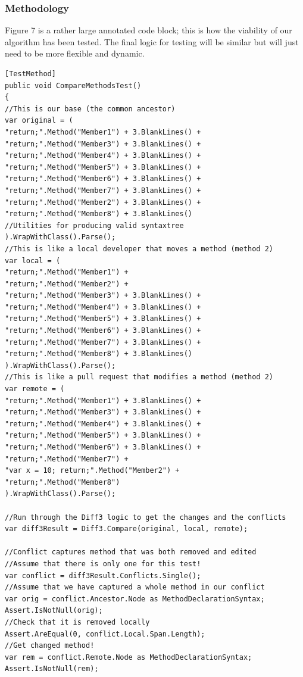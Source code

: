 \documentclass[10pt,draftclsnofoot,onecolumn]{IEEEtran}
\begin{document}
\subsubsection{Methodology}
Figure 7 is a rather large annotated code block; this is how the viability of our algorithm has been tested. The final logic for testing will be similar but will just need to be more flexible and dynamic.

\begingroup
\begin{lstlisting}
[TestMethod]
public void CompareMethodsTest()
{
//This is our base (the common ancestor)
var original = (
"return;".Method("Member1") + 3.BlankLines() +
"return;".Method("Member3") + 3.BlankLines() +
"return;".Method("Member4") + 3.BlankLines() +
"return;".Method("Member5") + 3.BlankLines() +
"return;".Method("Member6") + 3.BlankLines() +
"return;".Method("Member7") + 3.BlankLines() +
"return;".Method("Member2") + 3.BlankLines() +
"return;".Method("Member8") + 3.BlankLines()
//Utilities for producing valid syntaxtree
).WrapWithClass().Parse(); 
//This is like a local developer that moves a method (method 2)
var local = (
"return;".Method("Member1") +
"return;".Method("Member2") +
"return;".Method("Member3") + 3.BlankLines() +
"return;".Method("Member4") + 3.BlankLines() +
"return;".Method("Member5") + 3.BlankLines() +
"return;".Method("Member6") + 3.BlankLines() +
"return;".Method("Member7") + 3.BlankLines() +
"return;".Method("Member8") + 3.BlankLines()
).WrapWithClass().Parse();
//This is like a pull request that modifies a method (method 2)
var remote = (
"return;".Method("Member1") + 3.BlankLines() +
"return;".Method("Member3") + 3.BlankLines() +
"return;".Method("Member4") + 3.BlankLines() +
"return;".Method("Member5") + 3.BlankLines() +
"return;".Method("Member6") + 3.BlankLines() +
"return;".Method("Member7") +
"var x = 10; return;".Method("Member2") +
"return;".Method("Member8")
).WrapWithClass().Parse();

//Run through the Diff3 logic to get the changes and the conflicts
var diff3Result = Diff3.Compare(original, local, remote);

//Conflict captures method that was both removed and edited
//Assume that there is only one for this test!
var conflict = diff3Result.Conflicts.Single();
//Assume that we have captured a whole method in our conflict
var orig = conflict.Ancestor.Node as MethodDeclarationSyntax;
Assert.IsNotNull(orig);
//Check that it is removed locally
Assert.AreEqual(0, conflict.Local.Span.Length);
//Get changed method!
var rem = conflict.Remote.Node as MethodDeclarationSyntax;
Assert.IsNotNull(rem);


\end{lstlisting}
\end{document}
